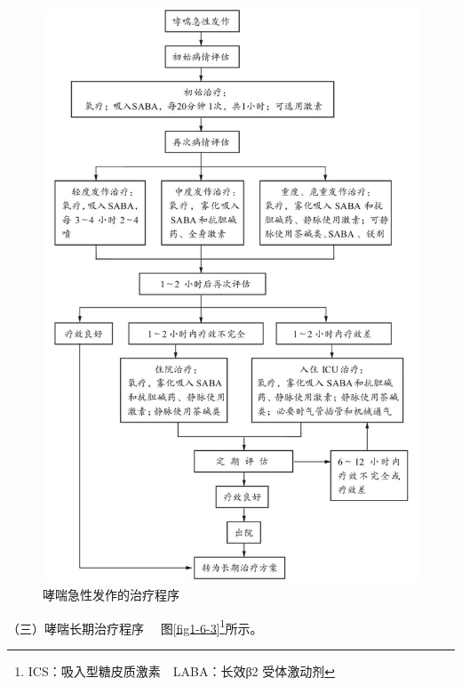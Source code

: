 \begin{figure}[!htbp]
 \centering
 \includegraphics{./images/Image00008.jpg}
 \captionsetup{justification=centering}
 \caption{哮喘急性发作的治疗程序}
 \label{fig1-6-2}
  \end{figure} 

{（三）哮喘长期治疗程序} 　图\ref{fig1-6-3}\footnote{ICS：吸入型糖皮质激素　LABA：长效β{2} 受体激动剂}所示。

